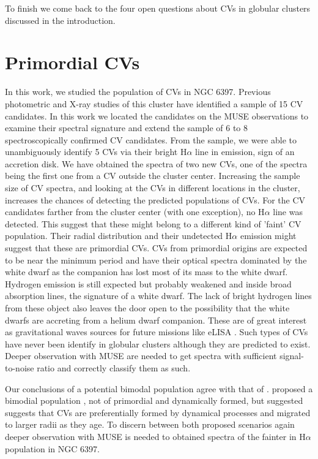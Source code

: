 To finish we come back to the four open questions about CVs in globular clusters discussed in the introduction. 

\section{Primordial CVs}

In this work, we studied the population of CVs in NGC 6397. Previous photometric and X-ray studies of this cluster have identified a sample of 15 CV candidates. In this work we located the candidates on the MUSE observations to examine their spectral signature and extend the sample of 6 to 8 spectroscopically confirmed CV candidates. From the sample, we were able to unambiguously identify 5 CVs via their bright H$\alpha$ line in emission, sign of an accretion disk. We have obtained the spectra of two new CVs, one of the spectra being the first one from a CV outside the cluster center. Increasing the sample size of CV spectra, and looking at the CVs in different locations in the cluster, increases the chances of detecting the predicted populations of CVs. For the CV candidates farther from the cluster center (with one exception), no H$\alpha$ line was detected. This suggest that these might belong to a different kind of 'faint' CV population. Their radial distribution and their undetected H$\alpha$ emission might suggest that these are primordial CVs. CVs from primordial origins are expected to be near the minimum period and have their optical spectra dominated by the white dwarf as the companion has lost most of its mass to the white dwarf. Hydrogen emission is still expected but probably weakened and inside broad absorption lines, the signature of a white dwarf. The lack of bright hydrogen lines from these object also leaves the door open to the possibility that the white dwarfs are accreting from a helium dwarf companion. These are of great interest as gravitational waves sources for future missions like eLISA \citep{elisa2012}. Such types of CVs have never been identify in globular clusters although they are predicted to exist. Deeper observation with MUSE are needed to get spectra with sufficient signal-to-noise ratio and correctly classify them as such. 

Our conclusions of a potential bimodal population agree with that of \cite{cohn_identification_2010}. \citeauthor{cohn_identification_2010} proposed a bimodial population , not of primordial and dynamically formed, but suggested suggests that CVs are preferentially formed by dynamical processes and migrated to larger radii as they age. To discern between both proposed scenarios again deeper observation with MUSE is needed to obtained spectra of the fainter in H$\alpha$ population in NGC 6397. 

